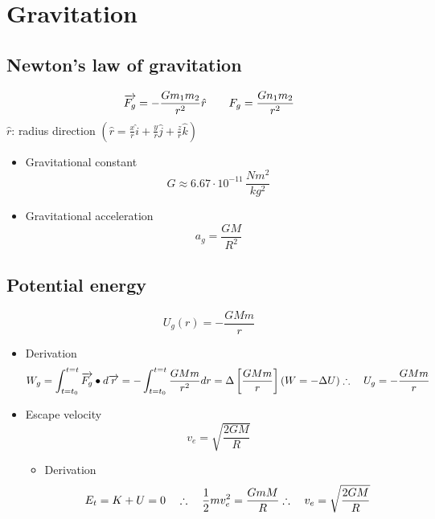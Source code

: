 \section{Gravitation}
    \subsection{Newton’s law of gravitation}
        \begin{equation}
            \overrightarrow{F_g}=-\frac{Gm_1m_2}{r^2}\hat{r} \qquad F_g=\frac{Gn_1m_2}{r^2}
        \end{equation}
        $\hat{r}$: radius direction $\left(\hat{r}=\frac{x}{r}\hat{i}+\frac{y}{r}\hat{j}+\frac{z}{r}\hat{k}\right)$
        \begin{itemize}
            \item Gravitational constant
                \begin{equation}
                    G\approx6.67\cdot 10^{-11} \, \frac{Nm^2}{kg^2}
                \end{equation}
            \item Gravitational acceleration
                \begin{equation}
                    a_g=\frac{GM}{R^2}
                \end{equation}
        \end{itemize}
    \subsection{Potential energy}
        \begin{equation}
            U_g(r)=-\frac{GMm}{r}
        \end{equation}
        \begin{itemize}
            \item Derivation
                \begin{equation}
                    W_g=\int_{t=t_0}^{t=t} \overrightarrow{F_g} \bullet d\overrightarrow{r}=-\int_{t=t_0}^{t=t} \frac{GMm}{r^2}dr =\Delta\left[\frac{GMm}{r}\right] \\
                    (W=-\Delta U) \\
                    \therefore \quad U_g=-\frac{GMm}{r}
                \end{equation}
            \item Escape velocity
                \begin{equation}
                    v_e=\sqrt{\frac{2GM}{R}}
                \end{equation}
                \begin{itemize}
                    \item Derivation
                        \begin{equation}
                            E_t=K+U=0 \quad \therefore \quad \frac{1}{2}mv_e^2=\frac{GmM}{R}\\
                            \therefore \quad v_e=\sqrt{\frac{2GM}{R}}
                        \end{equation}
                \end{itemize}
        \end{itemize}
